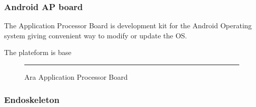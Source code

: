 \subsubsection{Android AP board}

The Application Processor Board is development kit for the Android Operating system giving convenient way to modify or update the OS.

The plateform is base

\begin{figure}[htbp]
  \centering
    \rule{35em}{0.5pt}
  \caption[Ara Application Processor Board]{Ara Application Processor Board}
  \label{fig:ap-board}
\end{figure}

\subsubsection{Endoskeleton}

